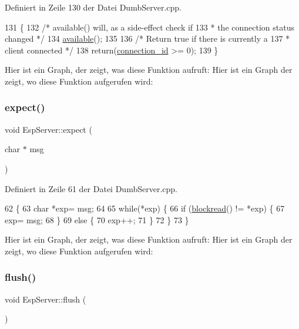 Definiert in Zeile 130 der Datei Dumb\+Server.\+cpp.


\begin{DoxyCode}
131 \{
132   \textcolor{comment}{/* available() will, as a side-effect check if}
133 \textcolor{comment}{   * the connection status changed */}
134   \hyperlink{class_esp_server_aad68b4972f6b8426004feeef6e98d02d}{available}();
135 
136   \textcolor{comment}{/* Return true if there is currently a}
137 \textcolor{comment}{   * client connected */}
138   \textcolor{keywordflow}{return}(\hyperlink{class_esp_server_ab601ba8cdf21497e04e862f22e52c590}{connection\_id} >= 0);
139 \}
\end{DoxyCode}
Hier ist ein Graph, der zeigt, was diese Funktion aufruft\+:
Hier ist ein Graph der zeigt, wo diese Funktion aufgerufen wird\+:
\mbox{\label{class_esp_server_a2008f0d315cff00a4bcc1120eeb2dc95}} 
\subsubsection{\texorpdfstring{expect()}{expect()}}
{\footnotesize\ttfamily void Esp\+Server\+::expect (\begin{DoxyParamCaption}\item[{char $\ast$}]{msg }\end{DoxyParamCaption})\hspace{0.3cm}{\ttfamily [private]}}



Definiert in Zeile 61 der Datei Dumb\+Server.\+cpp.


\begin{DoxyCode}
62 \{
63   \textcolor{keywordtype}{char} *exp= msg;
64 
65   \textcolor{keywordflow}{while}(*exp) \{
66     \textcolor{keywordflow}{if} (\hyperlink{class_esp_server_a3da02efeb5f2cbe3a8a1963e5e7f0a47}{blockread}() != *exp) \{
67       exp= msg;
68     \}
69     \textcolor{keywordflow}{else} \{
70       exp++;
71     \}
72   \}
73 \}
\end{DoxyCode}
Hier ist ein Graph, der zeigt, was diese Funktion aufruft\+:
Hier ist ein Graph der zeigt, wo diese Funktion aufgerufen wird\+:
\mbox{\label{class_esp_server_a05062a3ac7c70a79e991b66789384bf1}} 
\subsubsection{\texorpdfstring{flush()}{flush()}}
{\footnotesize\ttfamily void Esp\+Server\+::flush (\begin{DoxyParamCaption}{ }\end{DoxyParamCaption})\hspace{0.3cm}{\ttfamily [virtual]}}



